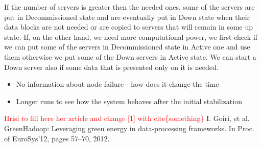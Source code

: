 \documentclass[9pt, a4paper]{article}
\theoremstyle{plain}
\begin{document}
  If the number of servers is greater then the needed ones, some of the servers
  are put in Decommissioned state and are eventually put in Down state when
  their data blocks are not needed or are copied to servers that will remain in
  some up state. If, on the other hand, we need more computational power, we
  first check if we can put some of the servers in Decommissioned state in
  Active one and use them otherwise we put some of the Down servers in Active
  state. We can start a Down server also if some data that is presented only on
  it is needed.



\begin{itemize}
  \item No information about node failure - how does it change the time 
  \item Longer runs to see how the system behaves after the initial
    stabilization
\end{itemize}

\begin{thebibliography}{widest entry}
   \textcolor{red}{Hrisi to fill here her article and change [1]
    with cite\{something\}}
   I. Goiri, et al. GreenHadoop: Leveraging green energy in
    data-processing frameworks. In Proc. of EuroSys’12, pages 57–70, 2012.
\end{thebibliography}

\hfill\\
\end{document}
